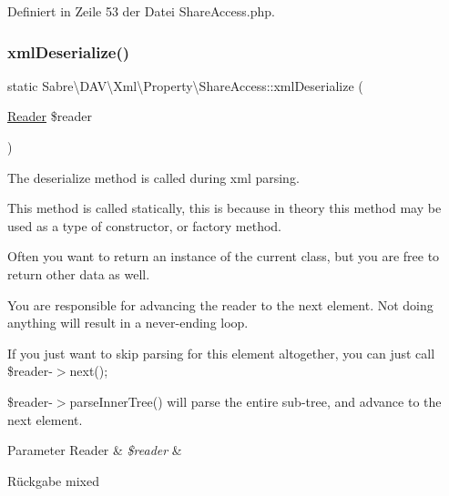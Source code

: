 Definiert in Zeile 53 der Datei Share\+Access.\+php.

\mbox{\label{class_sabre_1_1_d_a_v_1_1_xml_1_1_property_1_1_share_access_a5c998115b93a9410f93252aa4e448d5c}} 
\subsubsection{\texorpdfstring{xml\+Deserialize()}{xmlDeserialize()}}
{\footnotesize\ttfamily static Sabre\textbackslash{}\+D\+A\+V\textbackslash{}\+Xml\textbackslash{}\+Property\textbackslash{}\+Share\+Access\+::xml\+Deserialize (\begin{DoxyParamCaption}\item[{\mbox{\hyperlink{class_sabre_1_1_xml_1_1_reader}{Reader}}}]{\$reader }\end{DoxyParamCaption})\hspace{0.3cm}{\ttfamily [static]}}

The deserialize method is called during xml parsing.

This method is called statically, this is because in theory this method may be used as a type of constructor, or factory method.

Often you want to return an instance of the current class, but you are free to return other data as well.

You are responsible for advancing the reader to the next element. Not doing anything will result in a never-\/ending loop.

If you just want to skip parsing for this element altogether, you can just call \$reader-\/$>$next();

\$reader-\/$>$parse\+Inner\+Tree() will parse the entire sub-\/tree, and advance to the next element.


\begin{DoxyParams}[1]{Parameter}
Reader & {\em \$reader} & \\
\hline
\end{DoxyParams}
\begin{DoxyReturn}{Rückgabe}
mixed 
\end{DoxyReturn}


